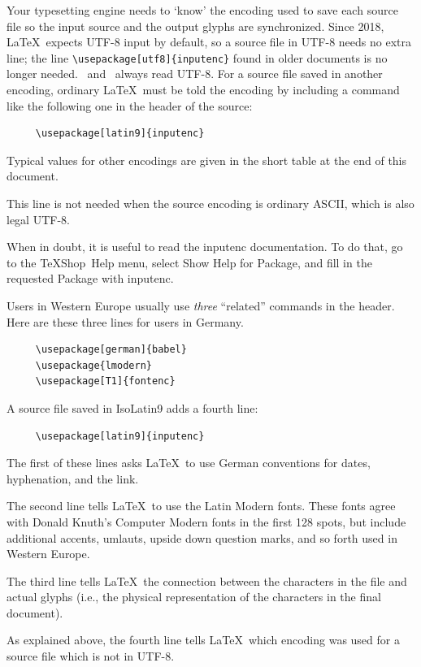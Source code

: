 \documentclass[letterpaper,11pt]{article}
\newcommand{\TS}{\textsf{\TeX Shop}}
\newcommand{\acr}[1]{\textsf{#1}}
\newcommand{\cmd}[1]{\textsf{#1}}
\newcommand{\mnu}[1]{\textsf{#1}}
\begin{document}
Your typesetting engine needs to `know' the encoding used to save each source file so the input source and the output glyphs are synchronized. Since 2018, \LaTeX\ expects \acr{UTF-8} input by default, so a source file in \acr{UTF-8} needs no extra line; the line \verb|\usepackage[utf8]{inputenc}| found in older documents is no longer needed. \XeLaTeX\ and \LuaLaTeX\ always read \acr{UTF-8}. For a source file saved in another encoding, ordinary \LaTeX\ must be told the encoding by
including a command like the following one in the header of the source:
\begin{verbatim}
     \usepackage[latin9]{inputenc}	
\end{verbatim}
Typical values for other encodings are given in the short table at the end of this
document.

This line is not needed when the source encoding is ordinary \acr{ASCII}, which is also legal \acr{UTF-8}. 

When in doubt, it is useful to read the \cmd{inputenc} documentation. To do that, go to the \TS\ \mnu{Help} menu, select \cmd{Show Help for Package}, and
fill in the requested Package with \cmd{inputenc}.

Users in Western Europe usually use \emph{three} ``related'' commands in the header.
Here are these three lines for users in Germany.
\begin{verbatim}
     \usepackage[german]{babel}
     \usepackage{lmodern}
     \usepackage[T1]{fontenc}
\end{verbatim}
A source file saved in \acr{IsoLatin9} adds a fourth line:
\begin{verbatim}
     \usepackage[latin9]{inputenc}
\end{verbatim}

The first of these lines asks \LaTeX\ to use German conventions for dates, hyphenation, and the link. 

The second line tells \LaTeX\ to use the Latin Modern fonts. These fonts agree with Donald Knuth's Computer Modern fonts in the first 128 spots, but include additional accents, umlauts, upside down question marks, and so forth used in Western Europe.

The third line tells \LaTeX\ the connection between the characters in the file and actual glyphs (i.e., the physical representation of the characters in the final document).

As explained above, the fourth line tells \LaTeX\ which encoding was used for a source file which is not in \acr{UTF-8}.
\end{document}
